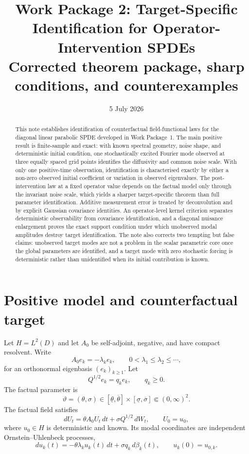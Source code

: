 \documentclass[11pt]{article}
\title{Work Package 2: Target-Specific Identification for Operator-Intervention SPDEs\\
\large Corrected theorem package, sharp conditions, and counterexamples}
\author{}
\date{5 July 2026}
\theoremstyle{remark}
\newcommand{\1}{\mathbf 1}
\begin{document}
\maketitle

\begin{abstract}
This note establishes identification of counterfactual field-functional laws for the diagonal linear parabolic SPDE developed in Work Package~1.  The main positive result is finite-sample and exact: with known spectral geometry, noise shape, and deterministic initial condition, one stochastically excited Fourier mode observed at three equally spaced grid points identifies the diffusivity and common noise scale.  With only one positive-time observation, identification is characterised exactly by either a non-zero observed initial coefficient or variation in observed eigenvalues.  The post-intervention law at a fixed operator value depends on the factual model only through the invariant noise scale, which yields a sharper target-specific theorem than full parameter identification.  Additive measurement error is treated by deconvolution and by explicit Gaussian covariance identities.  An operator-level kernel criterion separates deterministic observability from covariance identification, and a diagonal nuisance enlargement proves the exact support condition under which unobserved modal amplitudes destroy target identification.  The note also corrects two tempting but false claims: unobserved target modes are not a problem in the scalar parametric core once the global parameters are identified, and a target mode with zero stochastic forcing is deterministic rather than unidentified when its initial contribution is known.
\end{abstract}

\section{Positive model and counterfactual target}

Let $H=L^2(D)$ and let $A_0$ be self-adjoint, negative, and have compact resolvent.  Write
\[
 A_0e_k=-\lambda_ke_k,
 \qquad 0<\lambda_1\le \lambda_2\le\cdots,
\]
for an orthonormal eigenbasis $(e_k)_{k\ge1}$.  Let
\[
 Q^{1/2}e_k=q_ke_k,
 \qquad q_k\ge0.
\]
The factual parameter is
\[
 \vartheta=(\theta,\sigma)\in
 [\underline\theta,\overline\theta]
 \times[\underline\sigma,\overline\sigma]
 \Subset(0,\infty)^2.
\]
The factual field satisfies
\begin{equation}\label{eq:factual-spde}
 dU_t=\theta A_0U_t\,dt+\sigma Q^{1/2}\,dW_t,
 \qquad U_0=u_0,
\end{equation}
where $u_0\in H$ is deterministic and known.  Its modal coordinates are independent Ornstein--Uhlenbeck processes,
\begin{equation}\label{eq:modal-factual}
 du_k(t)=-\theta\lambda_ku_k(t)\,dt+\sigma q_k\,d\beta_k(t),
 \qquad u_k(0)=u_{0,k}.
\end{equation}
\end{document}
